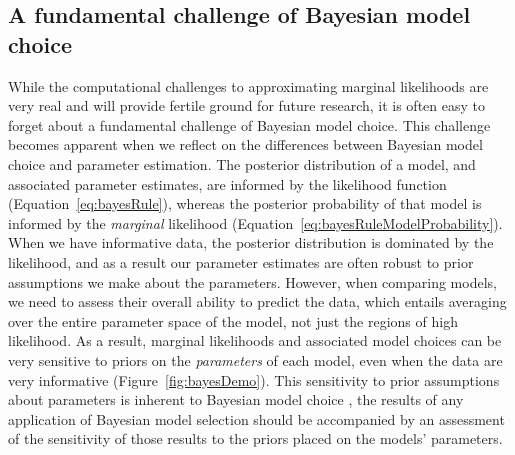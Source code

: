 

\subsection{A fundamental challenge of Bayesian model choice}

While the computational challenges to approximating marginal likelihoods
are very real and will provide fertile ground for future research,
it is often easy to forget about a fundamental challenge of Bayesian model
choice.
This challenge becomes apparent when we reflect on the differences between
Bayesian model choice and parameter estimation.
The posterior distribution of a model, and associated parameter estimates, are
informed by the likelihood function (Equation~\ref{eq:bayesRule}),
whereas the posterior probability of that model is informed by the
\emph{marginal} likelihood
(Equation~\ref{eq:bayesRuleModelProbability}).
When we have informative data, the posterior distribution is dominated by the
likelihood, and as a result our parameter estimates are often robust to prior
assumptions we make about the parameters.
However, when comparing models, we need to assess their overall ability to
predict the data, which entails averaging over the entire parameter space of
the model, not just the regions of high likelihood.
As a result, marginal likelihoods and associated model choices can be very
sensitive to priors on the \emph{parameters} of each model, even when the data
are very informative (Figure~\ref{fig:bayesDemo}).
This sensitivity to prior assumptions about parameters is inherent to Bayesian
model choice
, the results of any application of Bayesian
model selection should be accompanied by an assessment of the sensitivity of
those results to the priors placed on the models' parameters.


